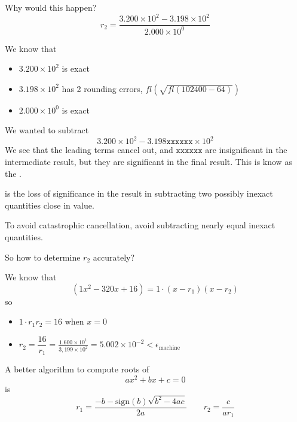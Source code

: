 Why would this happen? \[
    r_2 = \frac{3.200 \times 10^2 - 3.198 \times 10^2}{2.000 \times 10^0}
\]

We know that
\begin{itemize}
    \item \( 3.200 \times 10^2 \) is exact
    \item \( 3.198 \times 10^2 \) has 2 rounding errors, \( fl(\sqrt{fl(102400 - 64)}) \)
    \item \( 2.000 \times 10^0 \) is exact
\end{itemize}

We wanted to subtract \[
    3.200 \times 10^2 - 3.198\texttt{xxxxxx} \times 10^2
\] We see that the leading terms cancel out, and \( \texttt{xxxxxx} \) are insignificant in the intermediate result, but they are significant in the final result. This is know as the .

\begin{definition}
     is the loss of significance in the result in subtracting two possibly inexact quantities close in value.
\end{definition}

\begin{remark}
    To avoid catastrophic cancellation, avoid subtracting nearly equal inexact quantities.
\end{remark}

\begin{example}[Cont.]
    So how to determine \( r_2 \) accurately?

    We know that \[
        ( 1x^2 - 320x + 16 ) = 1 \cdot ( x - r_1 ) ( x - r_2 )
    \] so 
    \begin{itemize}
        \item \( 1 \cdot r_1 r_2 = 16 \) when \( x = 0 \)
        \item \( r_2 = \dfrac{16}{r_1} = \frac{1.600 \times 10^1}{3,199 \times 10^2} = 5.002 \times 10^{-2} < \epsilon_{\text{machine}} \)
    \end{itemize}
\end{example}

\begin{remark}
    A better algorithm to compute roots of \[
        ax^2 + bx + c = 0
    \] is \[
        r_1 = \frac{-b - \text{sign}(b) \sqrt{b^2 - 4ac}}{2a} \qquad r_2 = \frac{c}{ar_1}
    \]
\end{remark}